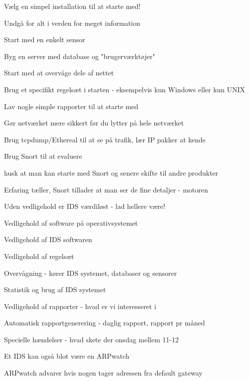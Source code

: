 
\begin{list1}
\item Vælg en simpel installation til at starte med!
\item Undgå for alt i verden for meget information
\begin{list2}
\item Start med en enkelt sensor
\item Byg en server med database og "brugerværktøjer"
\item Start med at overvåge dele af nettet
\item Brug et specifikt regelsæt i starten - eksempelvis kun Windows eller kun UNIX
\item Lav nogle simple rapporter til at starte med
\end{list2}
\item Gør netværket mere sikkert før du lytter på hele netværket
\item Brug tcpdump/Ethereal til at se på trafik, lær IP pakker at
  kende 
\item Brug Snort til at evaluere
\begin{list2}
\item husk at man kan starte med Snort og senere skifte til andre
produkter
\item Erfaring tæller, Snort tillader at man ser de fine detaljer - motoren
\end{list2}
\end{list1}


\begin{list1}
\item Uden vedligehold er IDS værdiløst - lad hellere være!
\begin{list2}
\item Vedligehold af software på operativsystemet
\item Vedligehold af IDS softwaren
\item Vedligehold af regelsæt
\end{list2}
\item Overvågning - kører IDS systemet, databaser og sensorer
\item Statistik og brug af IDS systemet
\begin{list2}
\item Vedligehold af rapporter - hvad er vi interesseret i
\item Automatisk rapportgenerering - daglig rapport, rapport pr måned
\item Specielle hændelser - hvad skete der onsdag mellem 11-12
\end{list2}
\item Et IDS kan også blot være en ARPwatch
\item ARPwatch advarer hvis nogen tager adressen fra default gateway
\end{list1}


